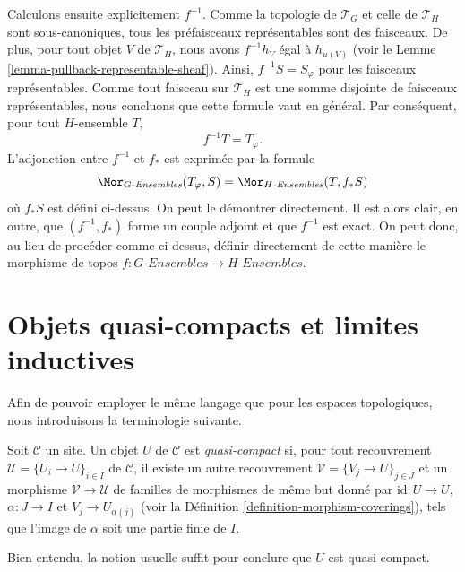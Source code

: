 \medskip\noindent
Calculons ensuite explicitement $f^{-1}$. Comme la topologie
de $\mathcal{T}_G$ et celle de $\mathcal{T}_H$ sont sous-canoniques, tous les
préfaisceaux représentables sont des faisceaux. De plus, pour tout objet $V$
de $\mathcal{T}_H$, nous avons $f^{-1}h_V$ égal à $h_{u(V)}$ (voir le
Lemme \ref{lemma-pullback-representable-sheaf}). Ainsi,
$f^{-1}S = S_\varphi$ pour les faisceaux représentables. Comme tout faisceau sur
$\mathcal{T}_H$ est une somme disjointe de faisceaux représentables, nous concluons que
cette formule vaut en général. Par conséquent, pour tout $H$-ensemble $T$,
$$
f^{-1}T = T_\varphi.
$$
L’adjonction entre $f^{-1}$ et $f_*$ est exprimée par la formule
$$
\Mor_{G\textit{-Ensembles}}(T_\varphi, S) =
\Mor_{H\textit{-Ensembles}}(T, f_*S)
$$
où $f_*S$ est défini ci-dessus. On peut le démontrer directement. Il est alors clair,
en outre, que $(f^{-1}, f_*)$ forme un couple adjoint et que $f^{-1}$ est exact.
On peut donc, au lieu de procéder comme ci-dessus, définir directement de cette
manière le morphisme de topos
$f : G\textit{-Ensembles} \to H\textit{-Ensembles}$.












\section{Objets quasi-compacts et limites inductives}
\label{section-quasi-compact}

\noindent
Afin de pouvoir employer le même langage que pour les espaces topologiques,
nous introduisons la terminologie suivante.

\begin{definition}
\label{definition-quasi-compact}
Soit $\mathcal{C}$ un site. Un objet $U$ de $\mathcal{C}$ est
{\it quasi-compact} si, pour tout recouvrement $\mathcal{U} = \{U_i \to U\}_{i \in I}$
de $\mathcal{C}$, il existe un autre recouvrement
$\mathcal{V} = \{V_j \to U\}_{j \in J}$ et un morphisme
$\mathcal{V} \to \mathcal{U}$ de familles de morphismes de même but
donné par $\text{id} : U \to U$, $\alpha : J \to I$ et $V_j \to U_{\alpha(j)}$
(voir la Définition \ref{definition-morphism-coverings}),
tels que l’image de $\alpha$ soit une partie finie de $I$.
\end{definition}

\noindent
Bien entendu, la notion usuelle suffit pour conclure que
$U$ est quasi-compact.

